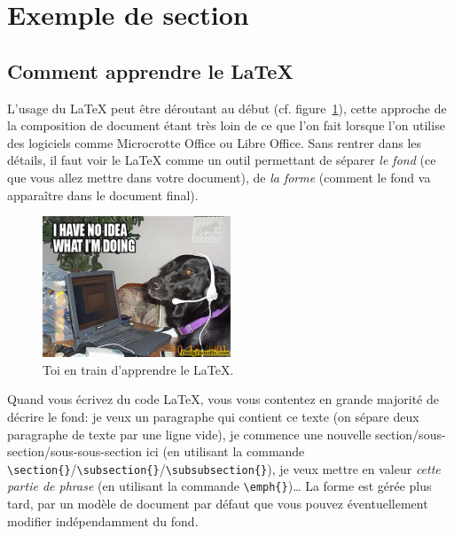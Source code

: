 \section{Exemple de section}

    \subsection{Comment apprendre le \LaTeX}
        L'usage du \LaTeX{} peut être déroutant au début (cf. figure~\ref{chien}), cette approche de la composition de document étant très loin de ce que l'on fait lorsque l'on utilise des logiciels comme Microcrotte Office ou Libre Office.
        Sans rentrer dans les détails, il faut voir le \LaTeX{} comme un outil permettant de séparer \emph{le fond} (ce que vous allez mettre dans votre document), de \emph{la forme} (comment le fond va apparaître dans le document final).

        \begin{figure}[!ht]
            \centering %
                \includegraphics[width=0.5\textwidth]{images/tech-support-dog.jpg} %
            \caption{Toi en train d'apprendre le \LaTeX.} %
            \label{chien} %
        \end{figure}
        
        Quand vous écrivez du code \LaTeX, vous vous contentez en grande majorité de décrire le fond:
        je veux un paragraphe qui contient ce texte (on sépare deux paragraphe de texte par une ligne vide), je commence une nouvelle section/sous-section/sous-sous-section ici (en utilisant la commande \verb|\section{}|/\verb|\subsection{}|/\verb|\subsubsection{}|), je veux mettre en valeur \emph{cette partie de phrase} (en utilisant la commande \verb|\emph{}|)…
        La forme est gérée plus tard, par un modèle de document par défaut que vous pouvez éventuellement modifier indépendamment du fond.

